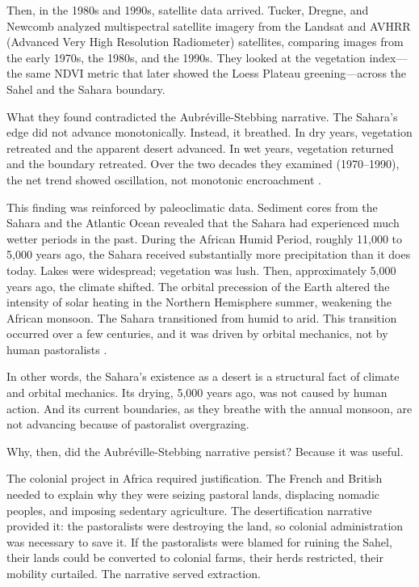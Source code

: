 \documentclass[12pt,a4paper]{article}
\begin{document}
Then, in the 1980s and 1990s, satellite data arrived. Tucker, Dregne, and Newcomb analyzed multispectral satellite imagery from the Landsat and AVHRR (Advanced Very High Resolution Radiometer) satellites, comparing images from the early 1970s, the 1980s, and the 1990s. They looked at the vegetation index—the same NDVI metric that later showed the Loess Plateau greening—across the Sahel and the Sahara boundary.

What they found contradicted the Aubréville-Stebbing narrative. The Sahara's edge did not advance monotonically. Instead, it breathed. In dry years, vegetation retreated and the apparent desert advanced. In wet years, vegetation returned and the boundary retreated. Over the two decades they examined (1970–1990), the net trend showed oscillation, not monotonic encroachment \citep{Tucker:1991}.

This finding was reinforced by paleoclimatic data. Sediment cores from the Sahara and the Atlantic Ocean revealed that the Sahara had experienced much wetter periods in the past. During the African Humid Period, roughly 11,000 to 5,000 years ago, the Sahara received substantially more precipitation than it does today. Lakes were widespread; vegetation was lush. Then, approximately 5,000 years ago, the climate shifted. The orbital precession of the Earth altered the intensity of solar heating in the Northern Hemisphere summer, weakening the African monsoon. The Sahara transitioned from humid to arid. This transition occurred over a few centuries, and it was driven by orbital mechanics, not by human pastoralists \citep{DeMenocal:2001}.

In other words, the Sahara's existence as a desert is a structural fact of climate and orbital mechanics. Its drying, 5,000 years ago, was not caused by human action. And its current boundaries, as they breathe with the annual monsoon, are not advancing because of pastoralist overgrazing.

Why, then, did the Aubréville-Stebbing narrative persist? Because it was useful.

The colonial project in Africa required justification. The French and British needed to explain why they were seizing pastoral lands, displacing nomadic peoples, and imposing sedentary agriculture. The desertification narrative provided it: the pastoralists were destroying the land, so colonial administration was necessary to save it. If the pastoralists were blamed for ruining the Sahel, their lands could be converted to colonial farms, their herds restricted, their mobility curtailed. The narrative served extraction.
\end{document}
